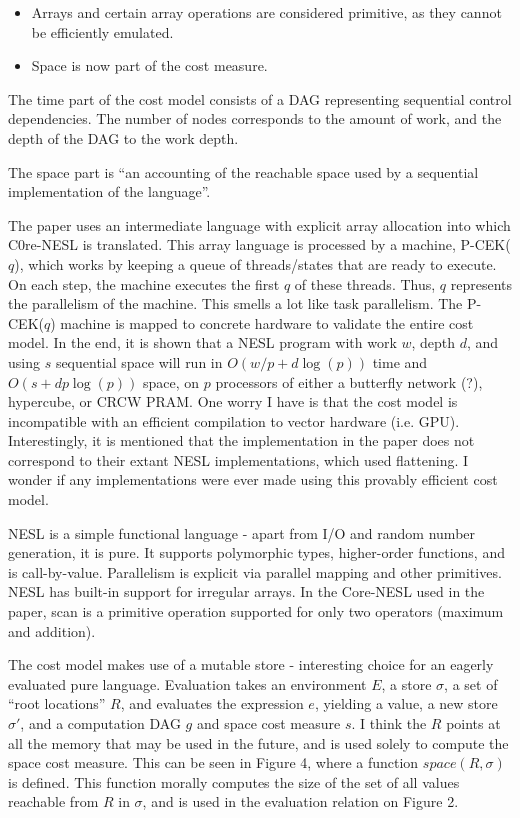 \documentclass[a4paper, oneside, final]{memoir}
\begin{document}
\begin{itemize}
\item Arrays and certain array operations are considered primitive, as
  they cannot be efficiently emulated.
\item Space is now part of the cost measure.
\end{itemize}

The time part of the cost model consists of a DAG representing
sequential control dependencies.  The number of nodes corresponds to
the amount of work, and the depth of the DAG to the work depth.

The space part is ``an accounting of the reachable space used by a
sequential implementation of the language''.

The paper uses an intermediate language with explicit array allocation
into which C0re-NESL is translated.  This array language is processed
by a machine, P-CEK($q$), which works by keeping a queue of
threads/states that are ready to execute.  On each step, the machine
executes the first $q$ of these threads.  Thus, $q$ represents the
parallelism of the machine.  This smells a lot like task parallelism.
The P-CEK($q$) machine is mapped to concrete hardware to validate the
entire cost model.  In the end, it is shown that a NESL program with
work $w$, depth $d$, and using $s$ sequential space will run in $O(w/p
+ d \log(p))$ time and $O(s + d p \log(p))$ space, on $p$ processors
of either a butterfly network (?), hypercube, or CRCW PRAM.  One worry
I have is that the cost model is incompatible with an efficient
compilation to vector hardware (i.e. GPU).  Interestingly, it is
mentioned that the implementation in the paper does not correspond to
their extant NESL implementations, which used flattening.  I wonder if
any implementations were ever made using this provably efficient cost
model.

NESL is a simple functional language - apart from I/O and random
number generation, it is pure.  It supports polymorphic types,
higher-order functions, and is call-by-value.  Parallelism is explicit
via parallel mapping and other primitives.  NESL has built-in support
for irregular arrays.  In the Core-NESL used in the paper, scan is a
primitive operation supported for only two operators (maximum and
addition).

The cost model makes use of a mutable store - interesting choice for
an eagerly evaluated pure language.  Evaluation takes an environment
$E$, a store $\sigma$, a set of ``root locations'' $R$, and evaluates
the expression $e$, yielding a value, a new store $\sigma'$, and a
computation DAG $g$ and space cost measure $s$.  I think the $R$
points at all the memory that may be used in the future, and is used
solely to compute the space cost measure.  This can be seen in Figure
4, where a function $space(R,\sigma)$ is defined.  This function
morally computes the size of the set of all values reachable from $R$
in $\sigma$, and is used in the evaluation relation on Figure 2.
\end{document}
